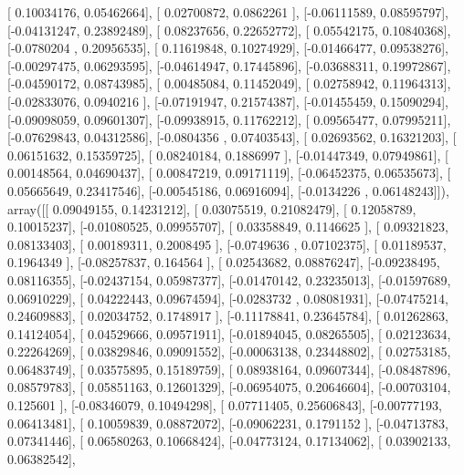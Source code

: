 \documentclass{article}
\begin{document}
       [ 0.10034176,  0.05462664],
       [ 0.02700872,  0.0862261 ],
       [-0.06111589,  0.08595797],
       [-0.04131247,  0.23892489],
       [ 0.08237656,  0.22652772],
       [ 0.05542175,  0.10840368],
       [-0.0780204 ,  0.20956535],
       [ 0.11619848,  0.10274929],
       [-0.01466477,  0.09538276],
       [-0.00297475,  0.06293595],
       [-0.04614947,  0.17445896],
       [-0.03688311,  0.19972867],
       [-0.04590172,  0.08743985],
       [ 0.00485084,  0.11452049],
       [ 0.02758942,  0.11964313],
       [-0.02833076,  0.0940216 ],
       [-0.07191947,  0.21574387],
       [-0.01455459,  0.15090294],
       [-0.09098059,  0.09601307],
       [-0.09938915,  0.11762212],
       [ 0.09565477,  0.07995211],
       [-0.07629843,  0.04312586],
       [-0.0804356 ,  0.07403543],
       [ 0.02693562,  0.16321203],
       [ 0.06151632,  0.15359725],
       [ 0.08240184,  0.1886997 ],
       [-0.01447349,  0.07949861],
       [ 0.00148564,  0.04690437],
       [ 0.00847219,  0.09171119],
       [-0.06452375,  0.06535673],
       [ 0.05665649,  0.23417546],
       [-0.00545186,  0.06916094],
       [-0.0134226 ,  0.06148243]]), array([[ 0.09049155,  0.14231212],
       [ 0.03075519,  0.21082479],
       [ 0.12058789,  0.10015237],
       [-0.01080525,  0.09955707],
       [ 0.03358849,  0.1146625 ],
       [ 0.09321823,  0.08133403],
       [ 0.00189311,  0.2008495 ],
       [-0.0749636 ,  0.07102375],
       [ 0.01189537,  0.1964349 ],
       [-0.08257837,  0.164564  ],
       [ 0.02543682,  0.08876247],
       [-0.09238495,  0.08116355],
       [-0.02437154,  0.05987377],
       [-0.01470142,  0.23235013],
       [-0.01597689,  0.06910229],
       [ 0.04222443,  0.09674594],
       [-0.0283732 ,  0.08081931],
       [-0.07475214,  0.24609883],
       [ 0.02034752,  0.1748917 ],
       [-0.11178841,  0.23645784],
       [ 0.01262863,  0.14124054],
       [ 0.04529666,  0.09571911],
       [-0.01894045,  0.08265505],
       [ 0.02123634,  0.22264269],
       [ 0.03829846,  0.09091552],
       [-0.00063138,  0.23448802],
       [ 0.02753185,  0.06483749],
       [ 0.03575895,  0.15189759],
       [ 0.08938164,  0.09607344],
       [-0.08487896,  0.08579783],
       [ 0.05851163,  0.12601329],
       [-0.06954075,  0.20646604],
       [-0.00703104,  0.125601  ],
       [-0.08346079,  0.10494298],
       [ 0.07711405,  0.25606843],
       [-0.00777193,  0.06413481],
       [ 0.10059839,  0.08872072],
       [-0.09062231,  0.1791152 ],
       [-0.04713783,  0.07341446],
       [ 0.06580263,  0.10668424],
       [-0.04773124,  0.17134062],
       [ 0.03902133,  0.06382542],
\end{document}
